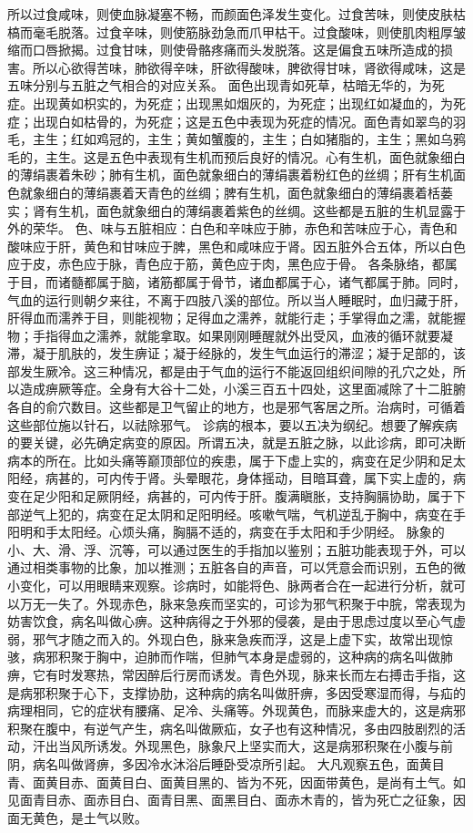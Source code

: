 \documentclass[12pt,UTF8]{ctexbook}
\begin{document}
所以过食咸味，则使血脉凝塞不畅，而颜面色泽发生变化。过食苦味，则使皮肤枯槁而毫毛脱落。过食辛味，则使筋脉劲急而爪甲枯干。过食酸味，则使肌肉粗厚皱缩而口唇掀揭。过食甘味，则使骨骼疼痛而头发脱落。这是偏食五味所造成的损害。所以心欲得苦味，肺欲得辛味，肝欲得酸味，脾欲得甘味，肾欲得咸味，这是五味分别与五脏之气相合的对应关系。
面色出现青如死草，枯暗无华的，为死症。出现黄如枳实的，为死症；出现黑如烟灰的，为死症；出现红如凝血的，为死症；出现白如枯骨的，为死症；这是五色中表现为死症的情况。面色青如翠鸟的羽毛，主生；红如鸡冠的，主生；黄如蟹腹的，主生；白如猪脂的，主生；黑如乌鸦毛的，主生。这是五色中表现有生机而预后良好的情况。心有生机，面色就象细白的薄绢裹着朱砂；肺有生机，面色就象细白的薄绢裹着粉红色的丝绸；肝有生机面色就象细白的薄绢裹着天青色的丝绸；脾有生机，面色就象细白的薄绢裹着栝蒌实；肾有生机，面色就象细白的薄绢裹着紫色的丝绸。这些都是五脏的生机显露于外的荣华。
色、味与五脏相应：白色和辛味应于肺，赤色和苦味应于心，青色和酸味应于肝，黄色和甘味应于脾，黑色和咸味应于肾。因五脏外合五体，所以白色应于皮，赤色应于脉，青色应于筋，黄色应于肉，黑色应于骨。
各条脉络，都属于目，而诸髓都属于脑，诸筋都属于骨节，诸血都属于心，诸气都属于肺。同时，气血的运行则朝夕来往，不离于四肢八溪的部位。所以当人睡眠时，血归藏于肝，肝得血而濡养于目，则能视物；足得血之濡养，就能行走；手掌得血之濡，就能握物；手指得血之濡养，就能拿取。如果刚刚睡醒就外出受风，血液的循环就要凝滞，凝于肌肤的，发生痹证；凝于经脉的，发生气血运行的滞涩；凝于足部的，该部发生厥冷。这三种情况，都是由于气血的运行不能返回组织间隙的孔穴之处，所以造成痹厥等症。全身有大谷十二处，小溪三百五十四处，这里面减除了十二脏腑各自的俞穴数目。这些都是卫气留止的地方，也是邪气客居之所。治病时，可循着这些部位施以针石，以祛除邪气。
诊病的根本，要以五决为纲纪。想要了解疾病的要关键，必先确定病变的原因。所谓五决，就是五脏之脉，以此诊病，即可决断病本的所在。比如头痛等巅顶部位的疾患，属于下虚上实的，病变在足少阴和足太阳经，病甚的，可内传于肾。头晕眼花，身体摇动，目暗耳聋，属下实上虚的，病变在足少阳和足厥阴经，病甚的，可内传于肝。腹满瞋胀，支持胸膈协助，属于下部逆气上犯的，病变在足太阴和足阳明经。咳嗽气喘，气机逆乱于胸中，病变在手阳明和手太阳经。心烦头痛，胸膈不适的，病变在手太阳和手少阴经。
脉象的小、大、滑、浮、沉等，可以通过医生的手指加以鉴别；五脏功能表现于外，可以通过相类事物的比象，加以推测；五脏各自的声音，可以凭意会而识别，五色的微小变化，可以用眼睛来观察。诊病时，如能将色、脉两者合在一起进行分析，就可以万无一失了。外现赤色，脉来急疾而坚实的，可诊为邪气积聚于中脘，常表现为妨害饮食，病名叫做心痹。这种病得之于外邪的侵袭，是由于思虑过度以至心气虚弱，邪气才随之而入的。外现白色，脉来急疾而浮，这是上虚下实，故常出现惊骇，病邪积聚于胸中，迫肺而作喘，但肺气本身是虚弱的，这种病的病名叫做肺痹，它有时发寒热，常因醉后行房而诱发。青色外现，脉来长而左右搏击手指，这是病邪积聚于心下，支撑协肋，这种病的病名叫做肝痹，多因受寒湿而得，与疝的病理相同，它的症状有腰痛、足冷、头痛等。外现黄色，而脉来虚大的，这是病邪积聚在腹中，有逆气产生，病名叫做厥疝，女子也有这种情况，多由四肢剧烈的活动，汗出当风所诱发。外现黑色，脉象尺上坚实而大，这是病邪积聚在小腹与前阴，病名叫做肾痹，多因冷水沐浴后睡卧受凉所引起。
大凡观察五色，面黄目青、面黄目赤、面黄目白、面黄目黑的、皆为不死，因面带黄色，是尚有土气。如见面青目赤、面赤目白、面青目黑、面黑目白、面赤木青的，皆为死亡之征象，因面无黄色，是土气以败。
\end{document}
